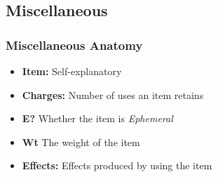 \subsection{Miscellaneous}
\subsubsection*{Miscellaneous Anatomy}
\begin{itemize}
\item \textbf{Item:} Self-explanatory
\item \textbf{Charges:} Number of uses an item retains
\item \textbf{E?} Whether the item is \emph{Ephemeral}
\item \textbf{Wt} The weight of the item
\item \textbf{Effects:} Effects produced by using the item
\end{itemize}

